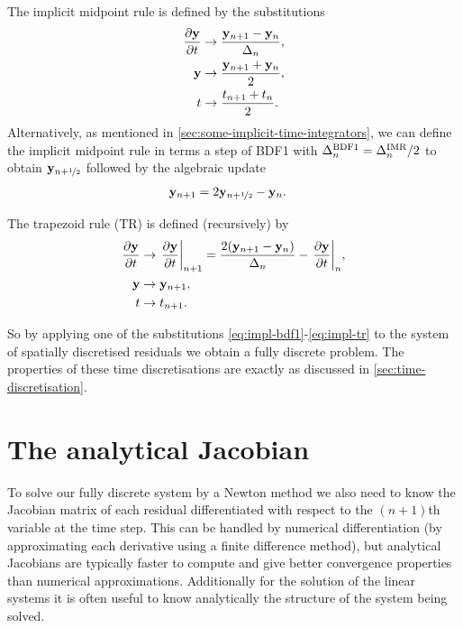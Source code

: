 The implicit midpoint rule is defined by the substitutions
\begin{equation}
  \begin{aligned}
    \frac{\partial \mathbf{y}}{\partial t} &\rightarrow \frac{\mathbf{y}_{n+1} - \mathbf{y}_n}{\Delta_{n}}, \\
    \mathbf{y} &\rightarrow \frac{\mathbf{y}_{n+1} + \mathbf{y}_n}{2}, \\
    t &\rightarrow \frac{t_{n+1} + t_n}{2}.
    \label{eq:impl-imr}
  \end{aligned}
\end{equation}
Alternatively, as mentioned in \autoref{sec:some-implicit-time-integrators}, we can define the implicit midpoint rule in terms a step of BDF1 with $\Delta_{n}^{\text{BDF1}} = \Delta_{n}^{\text{IMR}}/2$ to obtain $\mathbf{y}_{n+\nicefrac{1}{2}}$ followed by the algebraic update
\begin{equation}
  \begin{aligned}
    \label{eq:imr-bdf1}
    \mathbf{y}_{n+1} &= 2\mathbf{y}_{n+\nicefrac{1}{2}} - \mathbf{y}_n.
  \end{aligned}
\end{equation}

The trapezoid rule (TR) is defined (recursively) by
\begin{equation}
  \begin{aligned}
    \frac{\partial \mathbf{y}}{\partial t} &\rightarrow {\left. {\frac{\partial \mathbf{y}}{\partial t}} \right|_{n+1}} 
    = \frac{2(\mathbf{y}_{n+1} - \mathbf{y}_n)}{\Delta_{n}} - {\left. {\frac{\partial \mathbf{y}}{\partial t}} \right|_{n}}, \\
    \mathbf{y} &\rightarrow \mathbf{y}_{n+1}, \\
    t &\rightarrow t_{n+1}.
    \label{eq:impl-tr}
  \end{aligned}
\end{equation}

So by applying one of the substitutions \eqref{eq:impl-bdf1}-\eqref{eq:impl-tr} to the system of spatially discretised residuals we obtain a fully discrete problem.
The properties of these time discretisations are exactly as discussed in \autoref{sec:time-discretisation}.




\section{The analytical Jacobian}
\label{sec:llg-jacobian-calculation}

To solve our fully discrete system by a Newton method we also need to know the Jacobian matrix of each residual differentiated with respect to the $(n+1)$th variable at the time step.
This can be handled by numerical differentiation (\eg by approximating each derivative using a finite difference method), but analytical Jacobians are typically faster to compute and give better convergence properties than numerical approximations.
Additionally for the solution of the linear systems it is often useful to know analytically the structure of the system being solved.

